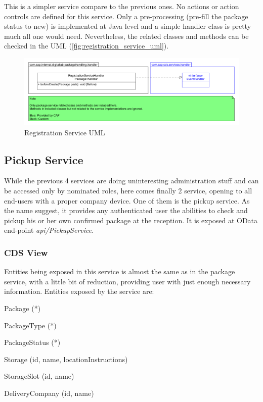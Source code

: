 This is a simpler service compare to the previous ones. No actions or action controls are defined for this service. Only a pre-processing (pre-fill the package status to new) is implemented at Java level and a simple handler class is pretty much all one would need. Nevertheless, the related classes and methods can be checked in the UML (\autoref{fig:registration_service_uml}). 

\begin{figure}[H]
    \centering
    \includegraphics[width=1\linewidth]{images/service_class_diagrams/registration_service_class_diagram.png}
    \caption{Registration Service UML}
    \label{fig:registration_service_uml}
\end{figure}




\subsection{Pickup Service}

While the previous 4 services are doing uninteresting administration stuff and can be accessed only by nominated roles, here comes finally 2 service, opening to all end-users with a proper company device. One of them is the pickup service. As the name suggest, it provides any authenticated user the abilities to check and pickup his or her own confirmed package at the reception. It is exposed at OData end-point \textit{api/PickupService}. 

\subsubsection{CDS View}

Entities being exposed in this service is almost the same as in the package service, with a little bit of reduction, providing user with just enough necessary information. Entities exposed by the service are:
\begin{compactenum}
	\item Package (*)
    \item PackageType (*)
    \item PackageStatus (*)
    \item Storage (id, name, locationInstructions)
    \item StorageSlot (id, name)
    \item DeliveryCompany (id, name)
\end{compactenum}

